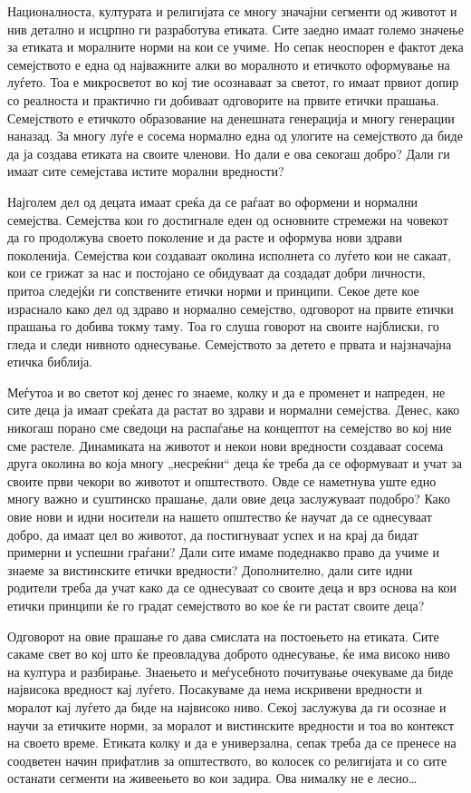 \documentclass[12pt,a4paper]{article}
\begin{document}
Националноста, културата и религијата се многу значајни сегменти од животот и
нив детално и исцрпно ги разработува етиката. Сите заедно имаат големо значење
за етиката и моралните норми на кои се учиме. Но сепак неоспорен е фактот дека
семејството е една од најважните алки во моралното и етичкото оформување на
луѓето. Тоа е микросветот во кој тие осознаваат за светот, го имаат првиот допир
со реалноста и практично ги добиваат одговорите на првите етички прашања.
Семејството е етичкото образование на денешната генерација и многу генерации
наназад. За многу луѓе е сосема нормално една од улогите на семејството да биде
да ја создава етиката на своите членови. Но дали е ова секогаш добро? Дали ги
имаат сите семејстава истите морални вредности?

Најголем дел од децата имаат среќа да се раѓаат во оформени и нормални
семејства. Семејства кои го достигнале еден од основните стремежи на човекот да
го продолжува своето поколение и да расте и оформува нови здрави поколенија.
Семејства кои создаваат околина исполнета со луѓето кои не сакаат, кои се грижат
за нас и постојано се обидуваат да создадат добри личности, притоа следејќи ги
сопствените етички норми и принципи. Секое дете кое израснало како дел од здраво
и нормално семејство, одговорот на првите етички прашања го добива токму таму.
Тоа го слуша говорот на своите најблиски, го гледа и следи нивното однесување.
Семејството за детето е првата и најзначајна етичка библија.

Меѓутоа и во светот кој денес го знаеме, колку и да е променет и напреден, не
сите деца ја имаат среќата да растат во здрави и нормални семејства. Денес, како
никогаш порано сме сведоци на распаѓање на концептот на семејство во кој ние сме
растеле. Динамиката на животот и некои нови вредности создаваат сосема друга
околина во која многу „несреќни“ деца ќе треба да се оформуваат и учат за своите
први чекори во животот и општеството. Овде се наметнува уште едно многу важно и
суштинско прашање, дали овие деца заслужуваат подобро? Како овие нови и идни
носители на нашето општество ќе научат да се однесуваат добро, да имаат цел во
животот, да постигнуваат успех и на крај да бидат примерни и успешни граѓани?
Дали сите имаме подеднакво право да учиме и знаеме за вистинските етички
вредности? Дополнително, дали сите идни родители треба да учат како да се
однесуваат со своите деца и врз основа на кои етички принципи ќе го градат
семејството во кое ќе ги растат своите деца?

Одговорот на овие прашање го дава смислата на постоењето на етиката. Сите сакаме
свет во кој што ќе преовладува доброто однесување, ќе има високо ниво на култура
и разбирање. Знаењето и меѓусебното почитување очекуваме да биде највисока
вредност кај луѓето. Посакуваме да нема искривени вредности и моралот кај луѓето
да биде на највисоко ниво. Секој заслужува да ги осознае и научи за етичките
норми, за моралот и вистинските вредности и тоа во контекст на своето време.
Етиката колку и да е универзална, сепак треба да се пренесе на соодветен начин
прифатлив за општеството, во колосек со религијата и со сите останати сегменти
на живеењето во кои задира. Ова нималку не е лесно\ldots
\end{document}
